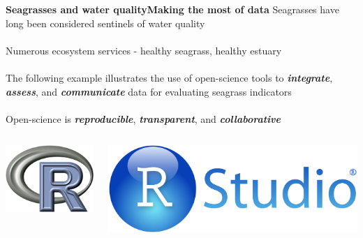 \documentclass[serif]{beamer}\usepackage[]{graphicx}\usepackage[]{color}
\newcommand{\emtxt}[1]{\textbf{\textit{#1}}}
\begin{document}
\begin{frame}{\textbf{Seagrasses and water quality}}{\textbf{Making the most of data}}
\onslide<+->
Seagrasses have long been considered sentinels of water quality \scriptsize \cite{Short96}\\~\\
\normalsize
Numerous ecosystem services - healthy seagrass, healthy estuary \\~\\
The following example illustrates the use of open-science tools to \emtxt{integrate}, \emtxt{assess}, and \emtxt{communicate} data for evaluating seagrass indicators \\~\\
\onslide<+->
Open-science is \emtxt{reproducible}, \emtxt{transparent}, and \emtxt{collaborative} \scriptsize \cite{Molloy09} \normalsize
\begin{columns}
\begin{column}{0.2\textwidth}
\centerline{\includegraphics[width = \textwidth]{fig/Rlogo.png}}
\end{column}
\begin{column}{0.2\textwidth}
\centerline{\includegraphics[width = \textwidth]{fig/RStudio.png}}

\end{column}
\end{columns}
\end{frame}
\end{document}
